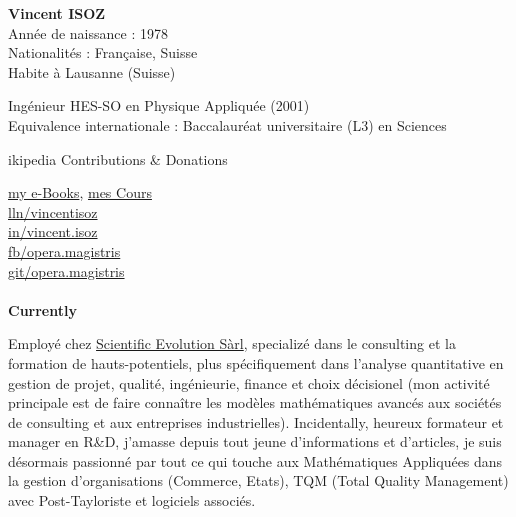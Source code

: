 	\pichskip{15pt}%
	\textbf{Vincent ISOZ}\\
	Année de naissance : 1978\\
	Nationalités : Française, Suisse\\
	Habite à Lausanne (Suisse)
	
	Ingénieur HES-SO en Physique Appliquée (2001)\\
	Equivalence internationale : Baccalauréat universitaire (L3) en Sciences

	\faWikipediaW ikipedia Contributions \& Donations
	
	\href{https://fr.scribd.com/collections/3709887/My-e-books}{{\color{blue} my e-Books}}, \href{https://www.video2brain.com/fr/formateur/vincent-isoz/}{{\color{blue} mes Cours}}
	\\
	\href{https://www.linkedin.com/in/vincentisoz}{\faLinkedinSquare{}lln/vincentisoz}\\
	\href{https://www.instagram.com/vincent.isoz/}{\faInstagram{}in/vincent.isoz}
	\\
	\href{https://www.facebook.com/groups/1793543747588689/}{\faFacebook{}fb/opera.magistris}\\
	\href{https://github.com/vincentisoz/opera_magistris/}{\faGithub{}git/opera.magistris}\\\\
	
	\textbf{Currently}
	
	Employé chez \href{http://www.scientific-evolution.com}{{\color{blue} Scientific Evolution Sàrl}}, specializé dans le consulting et la formation de hauts-potentiels, plus spécifiquement dans l'analyse quantitative en gestion de projet, qualité, ingénieurie, finance et choix décisionel (mon activité principale est de faire connaître les modèles mathématiques avancés aux sociétés de consulting et aux entreprises industrielles). Incidentally, heureux formateur et manager en R\&D, j'amasse depuis tout jeune d'informations et d'articles, je suis désormais passionné par tout ce qui touche aux Mathématiques Appliquées dans la gestion d'organisations (Commerce, Etats), TQM (Total Quality Management) avec Post-Tayloriste et logiciels associés.
	
